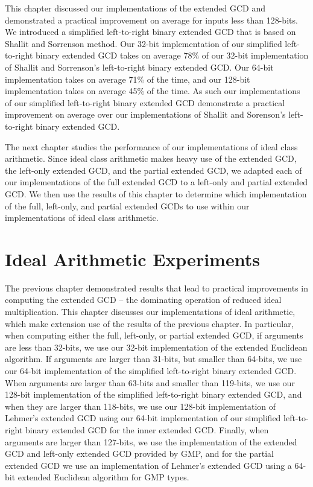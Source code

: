 \documentclass{ucalgthes1}
\theoremstyle{definition}
\begin{document}
This chapter discussed our implementations of the extended GCD and demonstrated a practical improvement on average for inputs less than 128-bits.   We introduced a simplified left-to-right binary extended GCD that is based on Shallit and Sorrenson \cite{Shallit1994} method.  Our 32-bit implementation of our simplified left-to-right binary extended GCD takes on average 78\% of our 32-bit implementation of Shallit and Sorrenson's left-to-right binary extended GCD.   Our 64-bit implementation takes on average 71\% of the time, and our 128-bit implementation takes on average 45\% of the time.  As such our implementations of our simplified left-to-right binary extended GCD demonstrate a practical improvement on average over our implementations of Shallit and Sorenson's left-to-right binary extended GCD.

The next chapter studies the performance of our implementations of ideal class arithmetic.  Since ideal class arithmetic makes heavy use of the extended GCD, the left-only extended GCD, and the partial extended GCD, we adapted each of our implementations of the full extended GCD to a left-only and partial extended GCD.  We then use the results of this chapter to determine which implementation of the full, left-only, and partial extended GCDs to use within our implementations of ideal class arithmetic.


\chapter{Ideal Arithmetic Experiments}
\label{chap:idealExperiments}

The previous chapter demonstrated results that lead to practical improvements in computing the extended GCD -- the dominating operation of reduced ideal multiplication.  This chapter discusses our implementations of ideal arithmetic, which make extension use of the results of the previous chapter.  In particular, when computing either the full, left-only, or partial extended GCD, if arguments are less than 32-bits, we use our 32-bit implementation of the extended Euclidean algorithm.  If arguments are larger than 31-bits, but smaller than 64-bits, we use our 64-bit implementation of the simplified left-to-right binary extended GCD.  When arguments are larger than 63-bits and smaller than 119-bits, we use our 128-bit implementation of the simplified left-to-right binary extended GCD, and when they are larger than 118-bits, we use our 128-bit implementation of Lehmer's extended GCD using our 64-bit implementation of our simplified left-to-right binary extended GCD for the inner extended GCD.  Finally, when arguments are larger than 127-bits, we use the implementation of the extended GCD and left-only extended GCD provided by GMP, and for the partial extended GCD we use an implementation of Lehmer's extended GCD using a 64-bit extended Euclidean algorithm for GMP types.
\end{document}
